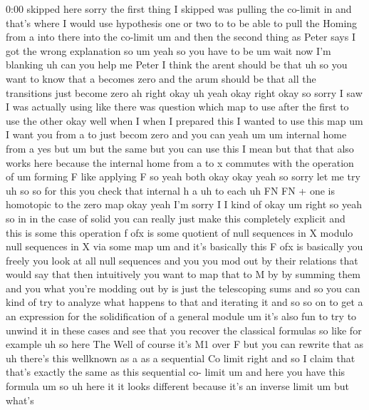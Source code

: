 \begin{unfinished}{0:00}
skipped  here  sorry  the  first  thing  I
skipped  was  pulling  the  co-limit  in  and
that's  where  I  would  use  hypothesis  one
or  two  to  to  be  able  to  pull  the  Homing
from  a  into  there  into  the  co-limit  um
and  then  the  second  thing  as  Peter  says
I  got  the  wrong  explanation  so
um  yeah  so  you  have  to
be
um
wait  now  I'm
blanking  uh  can  you  help  me
Peter  I  think  the  arent  should  be  that
uh  so  you  want  to  know  that  a  becomes
zero  and  the  arum  should  be
that  all  the  transitions  just  become
zero  ah  right  okay
uh  yeah
okay  right  okay  so
sorry  I  saw  I  was  actually
using  like  there  was  question  which  map
to  use  after  the
first  to  use  the  other  okay  well  when  I
when  I  prepared  this  I  wanted  to  use
this  map
um  I  want
you  from  a
to  just  becom  zero  and  you
can  yeah  um
um  internal  home  from
a  yes  but  um  but  the  same  but  you  can
use  this  I
mean  but  that  that  also  works  here
because  the  internal  home  from  a  to  x
commutes  with  the  operation  of  um
forming  F  like  applying  F
so  yeah  both  okay  okay  yeah  so  sorry  let
me  try  uh  so  so  for  this  you
check
that  internal  h  a  uh  to
each  uh
FN  FN  +  one  is  homotopic  to  the  zero  map
okay  yeah  I'm  sorry  I  I  kind
of
okay  um  right  so  yeah  so  in  in  the  case
of  solid  you  can  really  just  make  this
completely  explicit  and  this  is  some
this  operation  f  ofx  is  some  quotient  of
null  sequences  in  X  modulo  null
sequences  in  X  via  some  map  um  and  it's
basically  this  F  ofx  is  basically  you
freely  you  look  at  all  null  sequences
and  you  you  mod  out  by  their  relations
that  would  say  that  then  intuitively  you
want  to  map  that  to  M  by  by  summing  them
and  you  what  you're  modding  out  by  is
just  the  telescoping  sums  and  so  you  can
kind  of  try  to  analyze  what  happens  to
that  and  iterating  it  and  so  so  on  to
get  a  an  expression  for  the
solidification  of  a  general  module  um
it's  also  fun  to  try  to  unwind  it  in
these  cases  and  see  that  you  recover  the
classical  formulas  so  like  for
example  uh  so  here
The  Well  of  course  it's  M1  over  F  but
you  can  rewrite  that  as  uh  there's  this
wellknown
as  a  as  a  sequential  Co  limit  right  and
so  I  claim  that  that's  exactly  the  same
as  this  sequential  co-  limit  um  and  here
you  have  this  formula
um
so
uh  here  it  it  looks  different  because
it's  an  inverse  limit  um  but  what's

\end{unfinished}
